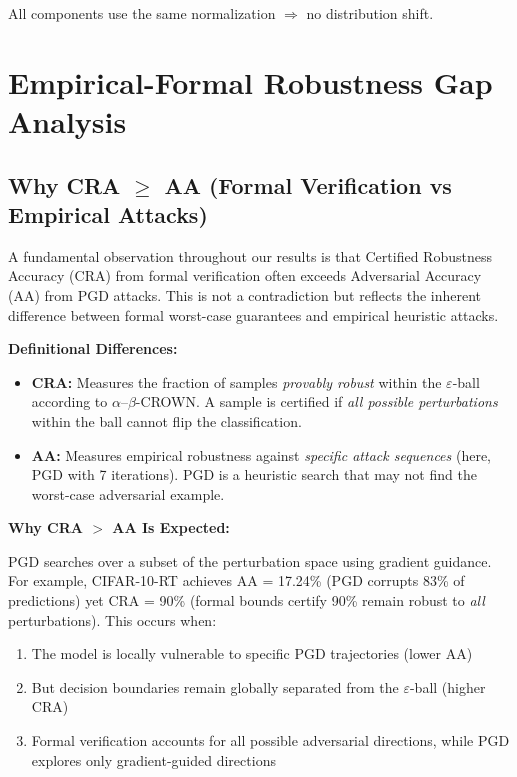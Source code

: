 \documentclass[11pt,a4paper]{article}
\begin{document}
All components use the same normalization $\Rightarrow$ no distribution shift.

\section{Empirical-Formal Robustness Gap Analysis}

\subsection{\texorpdfstring{Why CRA $\geq$ AA (Formal Verification vs Empirical Attacks)}{Why CRA >= AA (Formal Verification vs Empirical Attacks)}}

A fundamental observation throughout our results is that Certified Robustness Accuracy (CRA) from formal verification often exceeds Adversarial Accuracy (AA) from PGD attacks. This is not a contradiction but reflects the inherent difference between formal worst-case guarantees and empirical heuristic attacks.

\textbf{Definitional Differences:}

\begin{itemize}
    \item \textbf{CRA:} Measures the fraction of samples \textit{provably robust} within the $\varepsilon$-ball according to $\alpha$--$\beta$-CROWN. A sample is certified if \textit{all possible perturbations} within the ball cannot flip the classification.

    \item \textbf{AA:} Measures empirical robustness against \textit{specific attack sequences} (here, PGD with 7 iterations). PGD is a heuristic search that may not find the worst-case adversarial example.
\end{itemize}

\textbf{Why CRA $>$ AA Is Expected:}

PGD searches over a subset of the perturbation space using gradient guidance. For example, CIFAR-10-RT achieves AA = 17.24\% (PGD corrupts 83\% of predictions) yet CRA = 90\% (formal bounds certify 90\% remain robust to \textit{all} perturbations). This occurs when:

\begin{enumerate}
    \item The model is locally vulnerable to specific PGD trajectories (lower AA)
    \item But decision boundaries remain globally separated from the $\varepsilon$-ball (higher CRA)
    \item Formal verification accounts for all possible adversarial directions, while PGD explores only gradient-guided directions
\end{enumerate}
\end{document}
